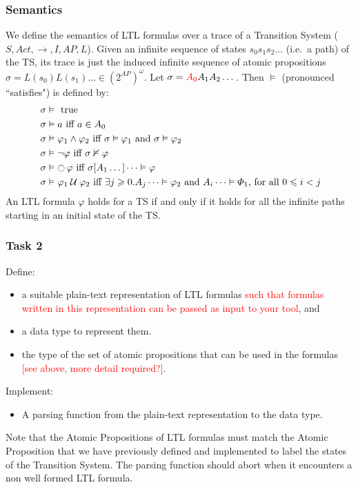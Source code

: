 \documentclass{article}
\begin{document}
\subsubsection*{Semantics}
We define the semantics of LTL formulas over a trace of a Transition System ($S, Act, \rightarrow, I, AP, L$). 
Given an infinite sequence of states $s_0s_1s_2 \dots$ (i.e.~a path) of the TS, 
its trace is just the induced infinite sequence of atomic propositions $ \sigma = L(s_0)L(s_1) \dots \in (2^{AP})^{\omega}$.
Let $\sigma = \textcolor{red}{A_0}A_1A_2 \dots$. Then $\vDash$ (pronounced ``satisfies") is defined by: 
\begin{align*}
    &\; \sigma \vDash \text{ true} \\
    &\; \sigma \vDash a \text{ iff } a \in A_0 \\
    &\; \sigma \vDash \varphi_1 \land \varphi_2 \text{ iff } \sigma \vDash \varphi_1 \text{ and } \sigma \vDash \varphi_2 \\
    &\; \sigma \vDash \neg \varphi \text{ iff } \sigma \nvDash \varphi \\
    &\; \sigma \vDash \mathop{\ocircle}{\varphi} \text{ iff } \sigma [A_1 \dots] \dots \vDash \varphi \\
    &\; \sigma \vDash \varphi_1 \mathbin{\mathcal{U}} \varphi_2 \text{ iff } \exists j \geqslant 0 .  A_j \dots \vDash \varphi_2 \text{ and } A_i \dots \vDash \varPhi_1 \text{, for all } 0 \leqslant  i < j
\end{align*}
An LTL formula $\varphi$ holds for a TS if and only if it holds for all the infinite paths 
starting in an initial state of the TS.

\subsubsection*{Task 2}
Define:
\begin{itemize}
    \item a suitable plain-text representation of LTL formulas \textcolor{red}{such that formulas written in this representation can be passed as input to your tool}, and
    \item a data type to represent them. 
    \item the type of the set of atomic propositions that can be used in the formulas \textcolor{red}{[see above, more detail required?]}.
\end{itemize}
Implement: 
\begin{itemize}
    \item A parsing function from the plain-text representation to the data type.
\end{itemize}
Note that the Atomic Propositions of LTL formulas must match the Atomic Proposition that we have previously 
defined and implemented to label the states of the Transition System. The parsing function should abort 
when it encounters a non well formed LTL formula.
\end{document}
